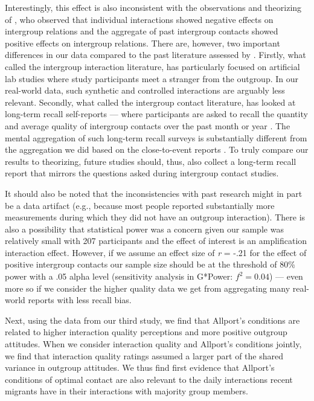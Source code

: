 \documentclass[man, 12pt, a4paper, mask]{apa7}
\theoremstyle{break}
\theoremstyle{plain}
\begin{document}
Interestingly, this effect is also inconsistent with the observations and theorizing of \citet[][]{MacInnis2015}, who observed that individual interactions showed negative effects on intergroup relations and the aggregate of past intergroup contacts showed positive effects on intergroup relations. There are, however, two important differences in our data compared to the past literature assessed by \citeauthor{MacInnis2015}. Firstly, what \citeauthor{MacInnis2015} called the intergroup interaction literature, has particularly focused on artificial lab studies where study participants meet a stranger from the outgroup. In our real-world data, such synthetic and controlled interactions are arguably less relevant. Secondly, what \citeauthor{MacInnis2015} called the intergroup contact literature, has looked at long-term recall self-reports --- where participants are asked to recall the quantity and average quality of intergroup contacts over the past month or year \citep{MacInnis2015}. The mental aggregation of such long-term recall surveys is substantially different from the aggregation we did based on the close-to-event reports \citep[][]{shiffman2008}. To truly compare our results to \citet[][]{MacInnis2015} theorizing, future studies should, thus, also collect a long-term recall report that mirrors the questions asked during intergroup contact studies.

It should also be noted that the inconsistencies with past research might in part be a data artifact (e.g., because most people reported substantially more measurements during which they did not have an outgroup interaction). There is also a possibility that statistical power was a concern given our sample was relatively small with 207 participants and the effect of interest is an amplification interaction effect. However, if we assume an effect size of \textit{r} = -.21 for the effect of positive intergroup contacts \citep[see][]{Pettigrew2006} our sample size should be at the threshold of 80\% power with a .05 alpha level (sensitivity analysis in G*Power: $f^2 = 0.04$) --- even more so if we consider the higher quality data we get from aggregating many real-world reports with less recall bias. 

Next, using the data from our third study, we find that Allport's conditions are related to higher interaction quality perceptions and more positive outgroup attitudes. When we consider interaction quality and Allport's conditions jointly, we find that interaction quality ratings assumed a larger part of the shared variance in outgroup attitudes. We thus find first evidence that Allport's conditions of optimal contact are also relevant to the daily interactions recent migrants have in their interactions with majority group members. 
\end{document}
